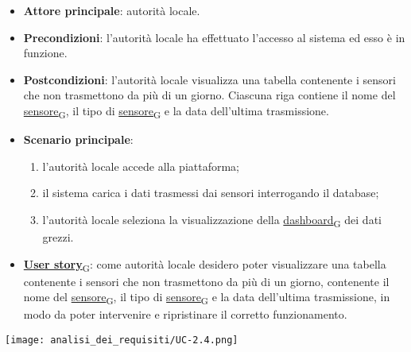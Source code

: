 \begin{itemize}
	\item \textbf{Attore principale}: autorità locale.
	\item \textbf{Precondizioni}: l'autorità locale ha effettuato l'accesso al sistema ed esso è in funzione.
	\item \textbf{Postcondizioni}: l'autorità locale visualizza una tabella contenente i sensori che non trasmettono da più di un giorno. Ciascuna riga
	      contiene il nome del \href{https://7last.github.io/docs/pb/documentazione-interna/glossario\#sensore}{sensore\textsubscript{G}}, il tipo di \href{https://7last.github.io/docs/pb/documentazione-interna/glossario\#sensore}{sensore\textsubscript{G}} e la data dell'ultima trasmissione.
	\item \textbf{Scenario principale}:
	      \begin{enumerate}
		      \item l'autorità locale accede alla piattaforma;
		      \item il sistema carica i dati trasmessi dai sensori interrogando il database;
		      \item l'autorità locale seleziona la visualizzazione della \href{https://7last.github.io/docs/pb/documentazione-interna/glossario\#dashboard}{dashboard\textsubscript{G}} dei dati grezzi.
	      \end{enumerate}
	\item \href{https://7last.github.io/docs/pb/documentazione-interna/glossario\#user-story}{\textbf{User story}\textsubscript{G}}:
	      come autorità locale desidero poter visualizzare una tabella contenente i sensori che non trasmettono da più di un giorno, contenente
	      il nome del \href{https://7last.github.io/docs/pb/documentazione-interna/glossario\#sensore}{sensore\textsubscript{G}}, il tipo di \href{https://7last.github.io/docs/pb/documentazione-interna/glossario\#sensore}{sensore\textsubscript{G}} e la data dell'ultima trasmissione, in modo da poter intervenire e ripristinare il corretto funzionamento.
\end{itemize}
\begin{center}
	\texttt{[image: analisi\_dei\_requisiti/UC-2.4.png]}
\end{center}

